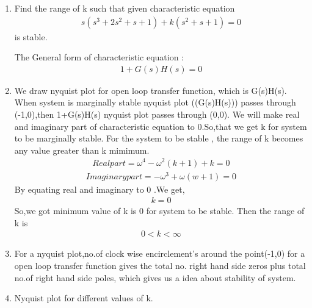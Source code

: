 \begin{enumerate}[label=\thesection.\arabic*.,ref=\thesection.\theenumi]
\item Find the range of k such that given characteristic equation
\begin{align}
s(s^3+2s^2+s+1) +k(s^2+s+1) = 0
\label{eq:ee18btech11042_1}
\end{align}
is stable.

\solution
The General form of characteristic equation :
\begin{align}
1+G(s)H(s) = 0
\label{eq:ee18btech11042_2}    
\end{align}
\item  We draw nyquist plot for open loop transfer function, which is G(s)H(s). When system is marginally stable nyquist plot ((G(s)H(s))) passes through (-1,0),then 1+G(s)H(s) nyquist plot passes through (0,0). We will make real and imaginary part of characteristic equation to 0.So,that  we  get  k for system to be  marginally stable. For the system to be stable , the range of k becomes any value greater than k mimimum.
\begin{align}
Real part = \omega^4 - \omega^2(k+1) +k = 0
\label{eq:ee18btech11042_3}
\end{align}
\begin{align}
Imaginary part = -\omega^3 +\omega(w+1) = 0
\label{eq:ee18btech11042_4}
\end{align}
By equating real and imaginary to 0 .We get,
\begin{align}
 k = 0
\label{eq:ee18btech11042_5}
\end{align}
So,we got minimum value of k is 0 for system to be stable. Then the range of k is
\begin{align}
0<k<\infty
\label{eq:ee18btech11042_6}
\end{align}

\item For a nyquist plot,no.of clock wise encirclement's around the point(-1,0) for a open loop transfer function gives the total no. right hand side  zeros plus total no.of right hand side poles, which gives us a idea about stability of system.
\item   Nyquist plot for different values of k.


\end{enumerate}
